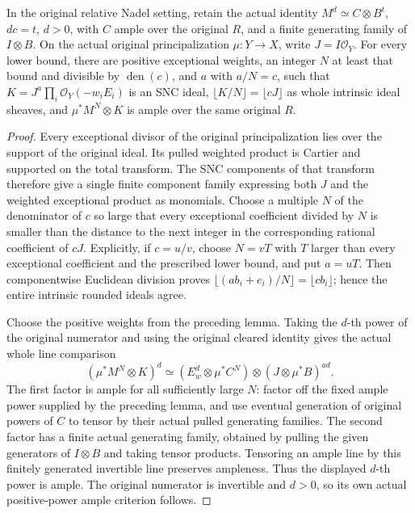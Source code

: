 \begin{lemma}
\label{lem:kn-relative-nadel-ample-numerator}
\leanok
{}
In the original relative Nadel setting, retain the actual identity
$M^d\simeq C\otimes B^t$, $dc=t$, $d>0$, with $C$ ample over the original
$R$, and a finite generating family of $I\otimes B$.  On the actual
original principalization $\mu:Y\to X$, write $J=I\mathcal O_Y$.
For every lower bound, there are positive exceptional weights, an
integer $N$ at least that bound and divisible by $\operatorname{den}(c)$,
and $a$ with $a/N=c$, such that
$K=J^a\prod_i\mathcal O_Y(-w_iE_i)$ is an SNC ideal,
$\lfloor K/N\rfloor=\lfloor cJ\rfloor$ as whole intrinsic ideal sheaves,
and $\mu^*M^N\otimes K$ is ample over the same original $R$.
\end{lemma}
\begin{proof}
Every exceptional divisor of the original principalization lies over the
support of the original ideal.  Its pulled weighted product is Cartier
and supported on the total transform.  The SNC components of that
transform therefore give a single finite component family expressing
both $J$ and the weighted exceptional product as monomials.  Choose a
multiple $N$ of the denominator of $c$ so large that every exceptional
coefficient divided by $N$ is smaller than the distance to the next
integer in the corresponding rational coefficient of $cJ$.  Explicitly,
if $c=u/v$, choose $N=vT$ with $T$ larger than every exceptional
coefficient and the prescribed lower bound, and put $a=uT$.
Then componentwise Euclidean division proves
$\lfloor(a b_i+e_i)/N\rfloor=\lfloor c b_i\rfloor$; hence the entire
intrinsic rounded ideals agree.

Choose the positive weights from the preceding lemma.  Taking the
$d$-th power of the original numerator and using the original cleared
identity gives the actual whole line comparison
\[
 (\mu^*M^N\otimes K)^d\simeq
 (E_w^d\otimes\mu^*C^N)\otimes
 (J\otimes\mu^*B)^{ad}.
\]
The first factor is ample for all sufficiently large $N$: factor off
the fixed ample power supplied by the preceding lemma, and use eventual
generation of original powers of $C$ to tensor by their actual pulled
generating families.  The second factor has a finite actual generating
family, obtained by pulling the given generators of $I\otimes B$ and
taking tensor products.  Tensoring an ample line by this finitely
generated invertible line preserves ampleness.  Thus the displayed
$d$-th power is ample.  The original numerator is invertible and
$d>0$, so its own actual positive-power ample criterion follows.
\end{proof}

